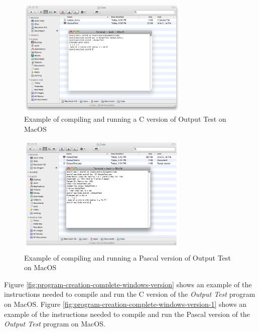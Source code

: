 \begin{figure}[h]
   \centering
   \includegraphics[width=0.73\textwidth]{./topics/program-creation/images/MacOSCompleteExample1} 
   \caption{Example of compiling and running a C version of Output Test on MacOS}
   \label{fig:program-creation-complete-macos-version}
\end{figure}

\begin{figure}[h]
   \centering
   \includegraphics[width=0.73\textwidth]{./topics/program-creation/images/MacOSCompleteExample} 
   \caption{Example of compiling and running a Pascal version of Output Test on MacOS}
   \label{fig:program-creation-complete-macos-version-1}
\end{figure}

\clearpage
Figure \ref{fig:program-creation-complete-windows-version} shows an example of the instructions needed to compile and run the C version of the \emph{Output Test} program on MacOS. Figure \ref{fig:program-creation-complete-windows-version-1} shows an example of the instructions needed to compile and run the Pascal version of the \emph{Output Test} program on MacOS.

